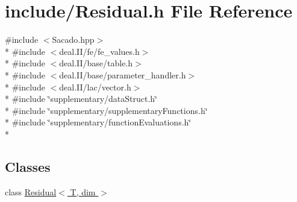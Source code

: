 \section{include/\-Residual.h File Reference}
\label{_residual_8h}
{\ttfamily \#include $<$Sacado.\-hpp$>$}\\*
{\ttfamily \#include $<$deal.\-I\-I/fe/fe\-\_\-values.\-h$>$}\\*
{\ttfamily \#include $<$deal.\-I\-I/base/table.\-h$>$}\\*
{\ttfamily \#include $<$deal.\-I\-I/base/parameter\-\_\-handler.\-h$>$}\\*
{\ttfamily \#include $<$deal.\-I\-I/lac/vector.\-h$>$}\\*
{\ttfamily \#include \char`\"{}supplementary/data\-Struct.\-h\char`\"{}}\\*
{\ttfamily \#include \char`\"{}supplementary/supplementary\-Functions.\-h\char`\"{}}\\*
{\ttfamily \#include \char`\"{}supplementary/function\-Evaluations.\-h\char`\"{}}\\*
\subsection*{Classes}
\begin{DoxyCompactItemize}
\item 
class \hyperlink{class_residual}{Residual$<$ T, dim $>$}
\end{DoxyCompactItemize}
